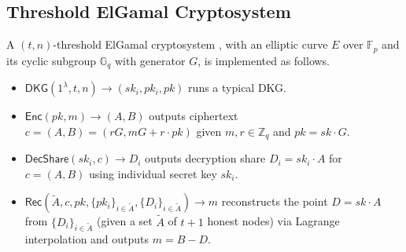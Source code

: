 \documentclass[conference]{IEEEtran}
\theoremstyle{definition}
\theoremstyle{remark}
\begin{document}
\subsection{Threshold ElGamal Cryptosystem}
\label{appendix:thrElGamal}
A $(t, n)$-threshold ElGamal cryptosystem \cite{desmedt1990Threshold, fouque2001threshold, cherniaeva2019homomorphic}, with an elliptic curve $E$ over $\mathbb{F}_p$ and its cyclic subgroup $\mathbb{G}_q$ with generator $G$, is implemented as follows.
\begin{itemize}
    \item $\mathsf{DKG}(1^\lambda, t, n) \rightarrow (sk_i, pk_i, pk)$ runs a typical DKG.
    \item $\mathsf{Enc}(pk, m) \rightarrow (A, B)$ outputs ciphertext $c = (A, B) = (r G, m G + r \cdot pk)$ given $m, r \in \mathbb{Z}_q$ and $pk = sk \cdot G$.
    \item $\mathsf{DecShare}(sk_i, c) \rightarrow D_i$ outputs decryption share $D_i = sk_i \cdot A$ for $c = (A, B)$ using individual secret key $sk_i$.
    \item $\mathsf{Rec}(\tilde{A}, c, pk, \{pk_i\}_{i \in \tilde{A}}, \{D_i\}_{i \in \tilde{A}}) \rightarrow m$ reconstructs the point $D = sk \cdot A$ from $\{D_i\}_{i \in \tilde{A}}$ (given a set $\tilde{A}$ of $t + 1$ honest nodes) via Lagrange interpolation and outputs $m = B - D$.
\end{itemize}

\end{document}
